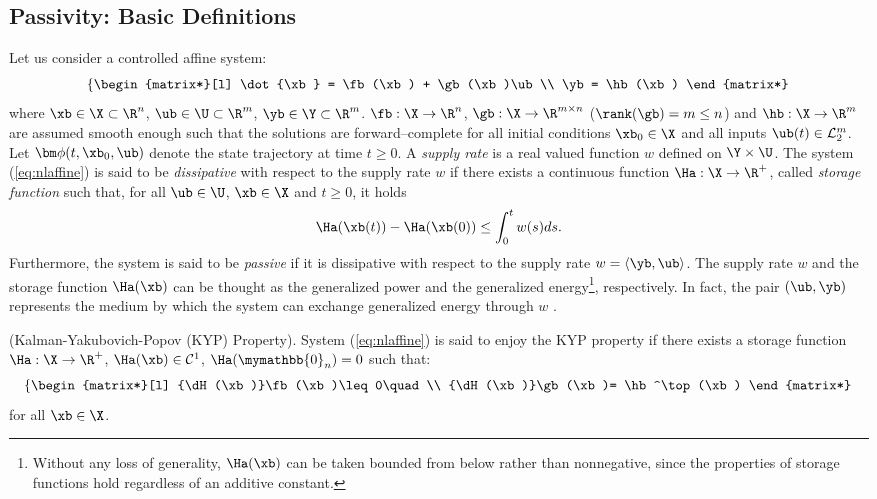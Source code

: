 \subsection{Passivity: Basic Definitions}
%
Let us consider a controlled affine system:
\begin{equation}\label{eq:nlaffine}
    \left\{
    \begin{matrix*}[l]
        \dot{\xb} = \fb(\xb) + \gb(\xb)\ub\\
        \yb = \hb(\xb)
    \end{matrix*}
    \right.
\end{equation}
where $\xb\in\X\subset\R^n$, $\ub\in\U\subset\R^m$, $\yb\in\Y\subset\R^m$. $\fb:\X\rightarrow\R^n$, $\gb:\X\rightarrow\R^{m\times n}$ ($\rank(\gb)= m\leq n$) and $\hb:\X\rightarrow\R^m$ are assumed smooth enough such that the solutions are forward--complete for all initial conditions $\xb_0\in\X$ and all inputs $\ub(t)\in\mathcal{L}_2^m$. Let $\bm\phi(t,\xb_0,\ub)$ denote the state trajectory at time $t\geq0$.
%
A \textit{supply rate} is a real valued function $w$ defined on $\Y\times\U$. The  system (\ref{eq:nlaffine}) is said to be \textit{dissipative} with respect to the supply rate $w$ if there exists a continuous function $\Ha:\X\rightarrow\R^+$, called \textit{storage function} such that, for all $\ub\in\U$, $\xb\in\X$ and $t\geq 0$, it holds
%
\begin{equation}
    \Ha(\xb(t))-\Ha(\xb(0)) \leq \int_0^tw(s)ds.
\end{equation}
%
Furthermore, the system is said to be \textit{passive} if it is dissipative with respect to the supply rate $w = \langle \yb,\ub \rangle$. The supply rate $w$ and the storage function $\Ha(\xb)$ can be thought as the generalized power and the generalized energy\footnote{Without any loss of generality, $\Ha(\xb)$ can be taken bounded from below rather than nonnegative, since the properties of storage functions hold regardless of an additive constant.}, respectively. In fact, the pair $(\ub,\yb)$ represents the medium by which the system can exchange generalized energy through $w$ \citep{secchi2007control}.
%
\begin{defn}(Kalman-Yakubovich-Popov (KYP) Property).
    System (\ref{eq:nlaffine}) is said to enjoy the KYP property if there exists a storage function $\Ha:\X\rightarrow\R^+$, $\Ha(\xb)\in\mathcal{C}^1$, $\Ha(\mymathbb{0}_n) = 0$ such that:
    \begin{equation}
        \left\{
        \begin{matrix*}[l]
            {\dH(\xb)}\fb(\xb)\leq 0\quad\\ 
            {\dH(\xb)}\gb(\xb)= \hb^\top(\xb)
        \end{matrix*}
        \right.
    \end{equation}
    for all $\xb\in\X$.
\end{defn}
